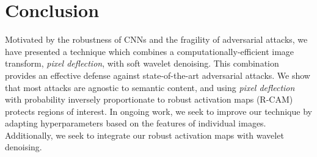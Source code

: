 \section{Conclusion}
Motivated by the robustness of CNNs and the fragility of adversarial attacks, we have presented a technique which combines a computationally-efficient image transform, \emph{pixel deflection}, with soft wavelet denoising. 
This combination provides an effective defense against state-of-the-art adversarial attacks. 
We show that most attacks are agnostic to semantic content, and using \emph{pixel deflection} with probability inversely proportionate to robust activation maps (R-CAM) protects regions of interest.
In ongoing work, we seek to improve our technique by adapting hyperparameters based on the features of individual images. Additionally, we seek to integrate our robust activation maps with wavelet denoising.